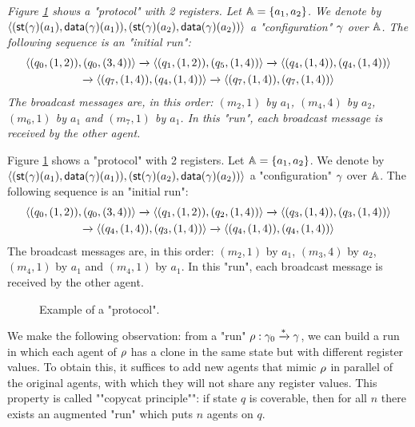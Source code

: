\begin{example}\label{ex:example-1}
	\textit{
	Figure \ref{fig:ex1} shows a "protocol" with 2 registers. 
	Let $\mathbb{A} = \{a_1, a_2\}$. We denote by $\langle (\mathsf{st}(\gamma)(a_1), \mathsf{data}(\gamma)(a_1)), (\mathsf{st}(\gamma)(a_2),\mathsf{data}(\gamma)(a_2)) \rangle$ a "configuration" $\gamma$ over $\mathbb{A}$. The following sequence is an "initial run":\vspace{-0.2cm}
	\begin{multline*}
	\langle (q_0, (1,2)), (q_0,(3,4)) \rangle \xrightarrow{} \langle (q_1, (1,2)), (q_5,(1,4)) \rangle \xrightarrow{} 
	\langle (q_4, (1,4)), (q_4,(1,4)) \rangle \\ \xrightarrow{} \langle (q_7, (1,4)), (q_4,(1,4)) \rangle \xrightarrow{} \langle (q_7, (1,4)), (q_7,(1,4)) \rangle
	\end{multline*}
	The broadcast messages are, in this order: $(m_2,1)$ by $a_1$, $(m_4,4)$ by $a_2$, $(m_6,1)$ by $a_1$ and $(m_7,1)$ by $a_1$. In this "run", each broadcast message is received by the other agent. 
}


	Figure \ref{fig:ex1} shows a "protocol" with 2 registers. 
	Let $\mathbb{A} = \{a_1, a_2\}$. We denote by $\langle (\mathsf{st}(\gamma)(a_1), \mathsf{data}(\gamma)(a_1)), (\mathsf{st}(\gamma)(a_2),\mathsf{data}(\gamma)(a_2)) \rangle$ a "configuration" $\gamma$ over $\mathbb{A}$. The following sequence is an "initial run":\vspace{-0.2cm}
	\begin{multline*}
		\langle (q_0, (1,2)), (q_0,(3,4)) \rangle \xrightarrow{} \langle (q_1, (1,2)), (q_2,(1,4)) \rangle \xrightarrow{} 
		\langle (q_3, (1,4)), (q_3,(1,4)) \rangle \\ \xrightarrow{} \langle (q_4, (1,4)), (q_3,(1,4)) \rangle \xrightarrow{} \langle (q_4, (1,4)), (q_4,(1,4)) \rangle
	\end{multline*}
	The broadcast messages are, in this order: $(m_2,1)$ by $a_1$, $(m_3,4)$ by $a_2$, $(m_4,1)$ by $a_1$ and $(m_4,1)$ by $a_1$. In this "run", each broadcast message is received by the other agent. 
\end{example}

\begin{figure}[t]
	\centering
	\resizebox*{!}{3.2cm}{
		
	}
	\caption{Example of a "protocol".}\label{fig:ex1}
\end{figure}
	
	


\begin{remark}
	\label{rem:copycat-principle}
	We make the following observation: from a "run" $\rho : \gamma_0 \xrightarrow{\ast} \gamma$, we can build a run in which each agent of $\rho$ has  a clone in the same state but with different register values. To obtain this, it suffices to add new agents that mimic $\rho$ in parallel of the original agents, with which they will not share any register values.  This property is called ""copycat principle"": if state $q$ is coverable, then for all $n$ there exists an augmented "run" which puts $n$ agents on $q$.
\end{remark}

